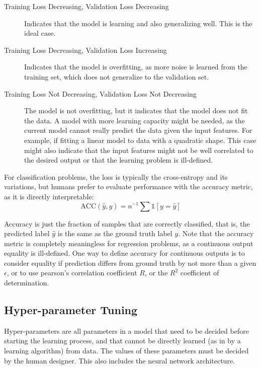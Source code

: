\begin{description}
    \item[Training Loss Decreasing, Validation Loss Decreasing] Indicates that the model is learning and also generalizing well. This is the ideal case.
    \item[Training Loss Decreasing, Validation Loss Increasing] Indicates that the model is overfitting, as more noise is learned from the training set, which does not generalize to the validation set.
    \item[Training Loss Not Decreasing, Validation Loss Not Decreasing] The model is not overfitting, but it indicates that the model does not fit the data. A model with more learning capacity might be needed, as the current model cannot really predict the data given the input features. For example, if fitting a linear model to data with a quadratic shape. This case might also indicate that the input features might not be well correlated to the desired output or that the learning problem is ill-defined.
\end{description}

For classification problems, the loss is typically the cross-entropy and its variations, but humans prefer to evaluate performance with the accuracy  metric, as it is directly interpretable:
\vspace*{1em}
\begin{equation}
    \text{ACC}(\hat{y}, y) = n^{-1} \sum \mathbb{1}[y = \hat{y}]
\end{equation}

Accuracy is just the fraction of samples that are correctly classified, that is, the predicted label $\hat{y}$ is the same as the ground truth label $y$. Note that the accuracy metric is completely meaningless for regression problems, as a continuous output equality is ill-defined. One way to define accuracy for continuous outputs is to consider equality if prediction differs from ground truth by not more than a given $\epsilon$, or to use pearson's correlation coefficient $R$, or the $R^2$ coefficient of determination.

\subsection{Hyper-parameter Tuning}

Hyper-parameters are all parameters in a model that need to be decided before starting the learning process, and that cannot be directly learned (as in by a learning algorithm) from data. The values of these parameters must be decided by the human designer. This also includes the neural network architecture.

